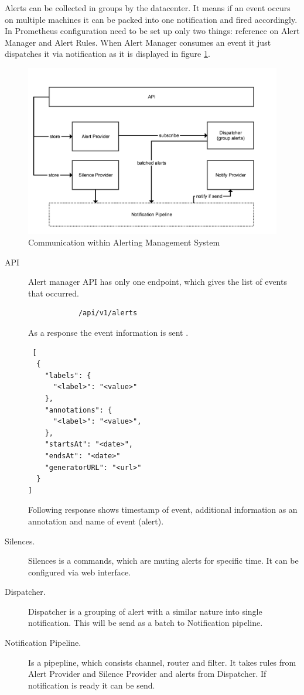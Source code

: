 Alerts can be collected in groups by the datacenter. It means if an event occurs on multiple machines it can be packed into one notification and fired accordingly. 
In Prometheus configuration need to be set up only two things: reference on Alert Manager and Alert Rules. When Alert Manager consumes an event it just dispatches it via notification as it is displayed in figure \ref{fig:alert_arch_detailed}.

\begin{figure}[H]
\begin{center}
  \includegraphics[width=\linewidth]{components/3/alert_details.png}
  \caption{Communication within Alerting Management System}
  \label{fig:alert_arch_detailed}
\end{center}
\end{figure}

\begin{description}
\item[API] Alert manager API has only one endpoint, which gives the list of events that occurred.
\begin{lstlisting}
            /api/v1/alerts
\end{lstlisting}

As a response the event information is sent \cite{alert_send}.
 \begin{lstlisting}
 [
  {
    "labels": {
      "<label>": "<value>"
    },
    "annotations": {
      "<label>": "<value>",
    },
    "startsAt": "<date>",
    "endsAt": "<date>"
    "generatorURL": "<url>"
  }
]
\end{lstlisting}
Following response shows timestamp of event, additional information as an annotation and name of event (alert). 
\item[Silences.] Silences is a commands, which are muting alerts for specific time. It can be configured via web interface. 
\item[Dispatcher.] Dispatcher is a grouping of alert with a similar nature into single notification. This will be send as a batch to Notification pipeline.
\item[Notification Pipeline.] Is a pipepline, which consists channel, router and filter. It takes rules from Alert Provider and Silence Provider and alerts from Dispatcher. If notification is ready it can be send. 
\end{description}


